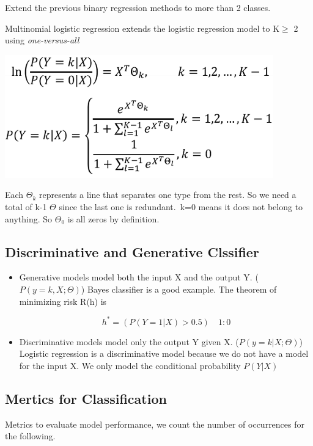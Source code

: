\documentclass[letterpaper,12pt]{article}
\begin{document}
Extend the previous binary regression methods to more than 2 classes.

Multinomial logistic regression extends the logistic regression model to K$\ge$
2 using \textit{one-versus-all}

\includegraphics*{Image/Multinomial logistic regression.png}

Each $\Theta_k$ represents a line that separates one type from the rest. So we
need a total of k-1 $\Theta$ since the last one is redundant.\ k=0 means it does
not belong to anything. So $\Theta_0$ is all zeros by definition.

\subsection{Discriminative and Generative Clssifier}

\begin{itemize}
    \item Generative models model both the input X and the output Y. ($P(y=k, X;\Theta)$)
          Bayes classifier is a good example. The theorem of minimizing risk R(h) is

          \[
              h^* = (P(Y=1|X)>0.5) \quad 1 : 0
          \]

    \item Discriminative models model only the output Y given X. ($P(y=k|X;\Theta)$)
          Logistic regression is a discriminative model because we do not have a model
          for the input X. We only model the conditional probability $P(Y|X)$
\end{itemize}

\subsection{Mertics for Classification}

Metrics to evaluate model performance, we count the number of occurrences for the
following.
\end{document}

